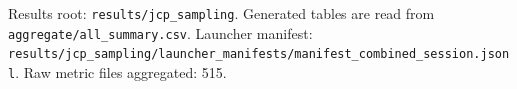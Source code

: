 Results root: \texttt{results/jcp\_sampling}. Generated tables are read from \texttt{aggregate/all\_summary.csv}. Launcher manifest: \texttt{results/jcp\_sampling/launcher\_manifests/manifest\_combined\_session.jsonl}. Raw metric files aggregated: 515.
